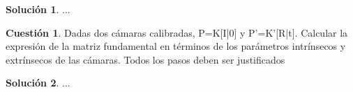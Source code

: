 \documentclass[a4paper, 11pt]{article}
\theoremstyle{definition}
\newtheorem{cuestion}{Cuestión}
\newtheorem*{solucion}{Solución}
\begin{document}
  \begin{solucion}
     	...
  \end{solucion}

  \begin{cuestion}
    Dadas dos cámaras calibradas, P=K[I|0] y P'=K'[R|t]. Calcular la expresión de la matriz
    fundamental en términos de los parámetros intrínsecos y extrínsecos de las cámaras. Todos los
    pasos deben ser justificados

  \end{cuestion}

  \begin{solucion}
     	...
  \end{solucion}
\end{document}
